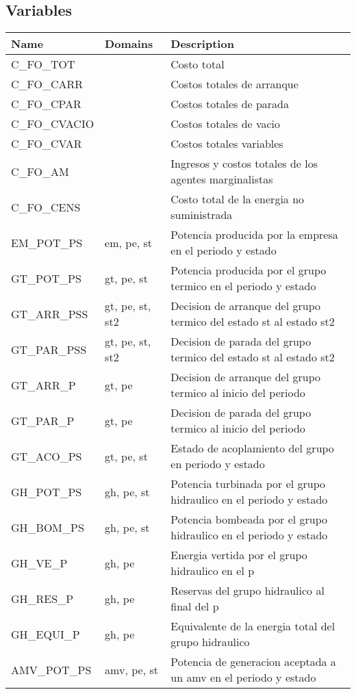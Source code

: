 \documentclass[11pt]{article}
\begin{document}
\subsection*{Variables}
\begin{tabular}{|l|l|l|} 
\hline 
\textbf{Name} & \textbf{Domains} & \textbf{Description}\\ 
\hline 
 
C\_FO\_TOT &  & Costo total \\ 
C\_FO\_CARR &  & Costos totales de arranque \\ 
C\_FO\_CPAR &  & Costos totales de parada \\ 
C\_FO\_CVACIO &  & Costos totales de vacio \\ 
C\_FO\_CVAR &  & Costos totales variables \\ 
C\_FO\_AM &  & Ingresos y costos totales de los agentes marginalistas \\ 
C\_FO\_CENS &  & Costo total de la energia no suministrada \\ 
EM\_POT\_PS & em, pe, st & Potencia producida por la empresa en el periodo y estado \\ 
GT\_POT\_PS & gt, pe, st & Potencia producida por el grupo termico en el periodo y estado \\ 
GT\_ARR\_PSS & gt, pe, st, st2 & Decision de arranque del grupo termico del estado st al estado st2 \\ 
GT\_PAR\_PSS & gt, pe, st, st2 & Decision de parada del grupo termico del estado st al estado st2 \\ 
GT\_ARR\_P & gt, pe & Decision de arranque del grupo termico al inicio del periodo \\ 
GT\_PAR\_P & gt, pe & Decision de parada del grupo termico al inicio del periodo \\ 
GT\_ACO\_PS & gt, pe, st & Estado de acoplamiento del grupo en periodo y estado \\ 
GH\_POT\_PS & gh, pe, st & Potencia turbinada por el grupo hidraulico en el periodo y estado \\ 
GH\_BOM\_PS & gh, pe, st & Potencia bombeada por el grupo hidraulico en el periodo y estado \\ 
GH\_VE\_P & gh, pe & Energia vertida por el grupo hidraulico en el p \\ 
GH\_RES\_P & gh, pe & Reservas del grupo hidraulico al final del p \\ 
GH\_EQUI\_P & gh, pe & Equivalente de la energia total del grupo hidraulico \\ 
AMV\_POT\_PS & amv, pe, st & Potencia de generacion aceptada a un amv en el periodo y estado \\ 

\end{tabular}
\end{document}
